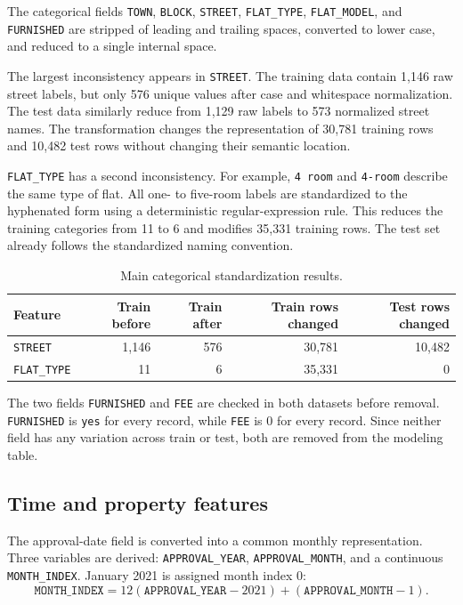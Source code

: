\documentclass[10pt]{article}
\begin{document}
The categorical fields \texttt{TOWN}, \texttt{BLOCK}, \texttt{STREET}, \texttt{FLAT\_TYPE}, \texttt{FLAT\_MODEL}, and \texttt{FURNISHED} are stripped of leading and trailing spaces, converted to lower case, and reduced to a single internal space.

The largest inconsistency appears in \texttt{STREET}.
The training data contain 1{,}146 raw street labels, but only 576 unique values after case and whitespace normalization.
The test data similarly reduce from 1{,}129 raw labels to 573 normalized street names.
The transformation changes the representation of 30{,}781 training rows and 10{,}482 test rows without changing their semantic location.

\texttt{FLAT\_TYPE} has a second inconsistency.
For example, \texttt{4 room} and \texttt{4-room} describe the same type of flat.
All one- to five-room labels are standardized to the hyphenated form using a deterministic regular-expression rule.
This reduces the training categories from 11 to 6 and modifies 35{,}331 training rows.
The test set already follows the standardized naming convention.

\begin{table}[h]
\centering
\small
\begin{tabular}{lrrrr}
\toprule
Feature & Train before & Train after & Train rows changed & Test rows changed \\
\midrule
\texttt{STREET} & 1{,}146 & 576 & 30{,}781 & 10{,}482 \\
\texttt{FLAT\_TYPE} & 11 & 6 & 35{,}331 & 0 \\
\bottomrule
\end{tabular}
\caption{Main categorical standardization results.}
\label{tab:category-cleaning}
\end{table}

The two fields \texttt{FURNISHED} and \texttt{FEE} are checked in both datasets before removal.
\texttt{FURNISHED} is \texttt{yes} for every record, while \texttt{FEE} is 0 for every record.
Since neither field has any variation across train or test, both are removed from the modeling table.

\subsection{Time and property features}

The approval-date field is converted into a common monthly representation.
Three variables are derived:
\texttt{APPROVAL\_YEAR},
\texttt{APPROVAL\_MONTH},
and a continuous \texttt{MONTH\_INDEX}.
January 2021 is assigned month index 0:
\begin{equation}
\texttt{MONTH\_INDEX}
=
12(\texttt{APPROVAL\_YEAR}-2021)
+
(\texttt{APPROVAL\_MONTH}-1).
\end{equation}
\end{document}
